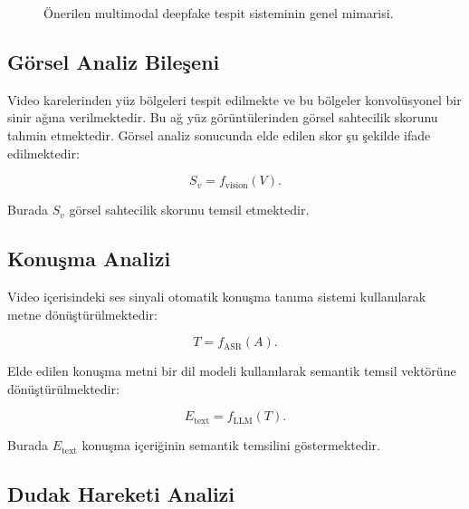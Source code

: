 \documentclass[conference]{IEEEtran}
\begin{document}
\begin{figure}[H]
\centering
{}
\caption{Önerilen multimodal deepfake tespit sisteminin genel mimarisi.}
\label{fig:arch}
\end{figure}

\subsection{Görsel Analiz Bileşeni}

Video karelerinden yüz bölgeleri tespit edilmekte ve bu bölgeler konvolüsyonel bir sinir ağına verilmektedir. Bu ağ yüz görüntülerinden görsel sahtecilik skorunu tahmin etmektedir. Görsel analiz sonucunda elde edilen skor şu şekilde ifade edilmektedir:

\[
S_v = f_{\text{vision}}(V).
\]

Burada $S_v$ görsel sahtecilik skorunu temsil etmektedir.

\subsection{Konuşma Analizi}

Video içerisindeki ses sinyali otomatik konuşma tanıma sistemi kullanılarak metne dönüştürülmektedir:

\[
T = f_{\text{ASR}}(A).
\]

Elde edilen konuşma metni bir dil modeli kullanılarak semantik temsil vektörüne dönüştürülmektedir:

\[
E_{\text{text}} = f_{\text{LLM}}(T).
\]

Burada $E_{\text{text}}$ konuşma içeriğinin semantik temsilini göstermektedir.

\subsection{Dudak Hareketi Analizi}
\end{document}
